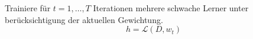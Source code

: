Trainiere für $t=1,\dots,T$ Iterationen mehrere schwache Lerner unter berücksichtigung der aktuellen Gewichtung.
$$
    h = \mathcal{L}(D, w_t)
$$